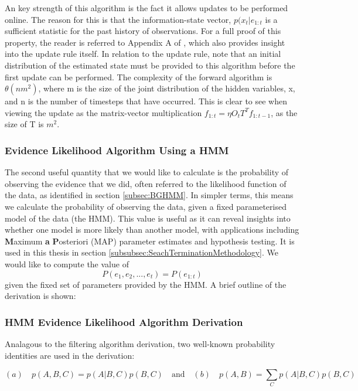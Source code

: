 An key strength of this algorithm is the fact it allows updates to be performed online. The reason for this is that the information-state vector, $p(x_t | e_{1:t}$ is a sufficient statistic for the past history of observations. For a full proof of this property, the reader is referred to Appendix A of \cite{Smallwood1973TheHorizon}, which also provides insight into the update rule itself. In relation to the update rule, note that an initial distribution of the estimated state must be provided to this algorithm before the first update can be performed. The complexity of the forward algorithm is $\theta (nm^2)$, where m is the size of the joint distribution of the hidden variables, x, and n is the number of timesteps that have occurred. This is clear to see when viewing the update as the matrix-vector multiplication $f_{1:t} = \eta O_{t} T^{T} f_{1:t-1}$, as the size of T is $m^2$.






\subsubsection{Evidence Likelihood Algorithm Using a HMM}\label{subsubsec:EvLikelihood}
The second useful quantity that we would like to calculate is the probability of observing the evidence that we did, often referred to the likelihood function of the data, as identified in section \ref{subsec:BGHMM}. In simpler terms, this means we calculate the probability of observing the data, given a fixed parameterised model of the data (the HMM). This value is useful as it can reveal insights into whether one model is more likely than another model, with applications including \textbf{M}aximum \textbf{a} \textbf{P}osteriori (MAP) parameter estimates and hypothesis testing. It is used in this thesis in section \ref{subsubsec:SeachTerminationMethodology}. We would like to compute the value of
\[P(e_1, e_2, ..., e_t) = P(e_{1:t})\]
given the fixed set of parameters provided by the HMM. A brief outline of the derivation is shown: 


\subsubsection{HMM Evidence Likelihood Algorithm Derivation}\label{subsubsec:BGEvidenceLikelihood}

Analagous to the filtering algorithm derivation, two well-known probability identities are used in the derivation: 
\begin{center}
\end{center}
\[(a) \quad p(A, B, C) = p(A | B, C) p(B, C) \quad \text{and} \quad (b) \quad p(A, B) = \sum_{C}{p(A | B, C)p(B, C)}\]

